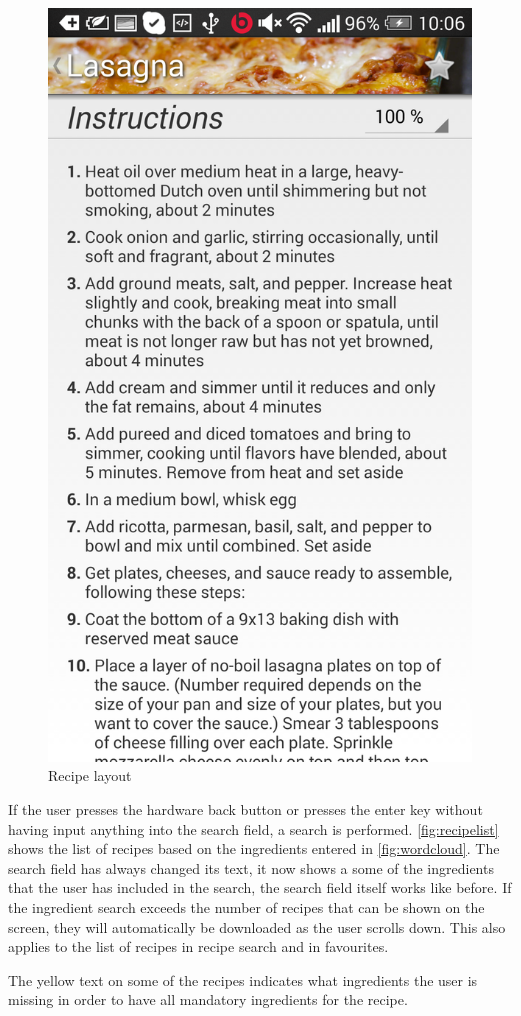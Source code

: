 \begin{figure}[H]
\begin{minipage}[t]{0.5\columnwidth}
\includegraphics[width=0.7\columnwidth]{img/screenshots/finalrecipe3.png}
\caption{Recipe layout\label{fig:recipe3}}
\end{minipage}
\end{figure}


If the user presses the hardware back button or presses the enter key without having input anything into the search field, a search is performed. \autoref{fig:recipelist} shows the list of recipes based on the ingredients entered in \autoref{fig:wordcloud}. The search field has always changed its text, it now shows a some of the ingredients that the user has included in the search, the search field itself works like before. If the ingredient search exceeds the number of recipes that can be shown on the screen, they will automatically be downloaded as the user scrolls down. This also applies to the list of recipes in recipe search and in favourites.


The yellow text on some of the recipes indicates what ingredients the user is missing in order to have all mandatory ingredients for the recipe.

